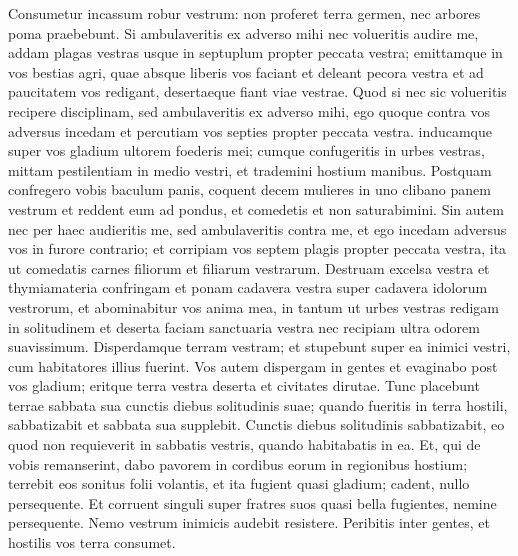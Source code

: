 \begin{biblechapter}
\begin{biblechapter}
\begin{biblechapter}
\begin{biblechapter}
\begin{biblechapter}
\begin{biblechapter}
\begin{biblechapter}
\begin{biblechapter}
\begin{biblechapter}
\begin{biblechapter}
\begin{biblechapter}
\begin{biblechapter}
\begin{biblechapter}
\begin{biblechapter}
\begin{biblechapter}
\begin{biblechapter}
\begin{biblechapter}
\begin{biblechapter}
\begin{biblechapter}
\begin{biblechapter}
\begin{biblechapter}
\begin{biblechapter}
\begin{biblechapter}
\begin{biblechapter}
\begin{biblechapter}
\begin{biblechapter}
\verse Consumetur incassum robur vestrum: non proferet terra germen, nec arbores poma praebebunt.
 \verse Si ambulaveritis ex adverso mihi nec volueritis audire me, addam plagas vestras usque in septuplum propter peccata vestra; 
\verse emittamque in vos bestias agri, quae absque liberis vos faciant et deleant pecora vestra et ad paucitatem vos redigant, desertaeque fiant viae vestrae.
 \verse Quod si nec sic volueritis recipere disciplinam, sed ambulaveritis ex adverso mihi, 
\verse ego quoque contra vos adversus incedam et percutiam vos septies propter peccata vestra. 
\verse inducamque super vos gladium ultorem foederis mei; cumque confugeritis in urbes vestras, mittam pestilentiam in medio vestri, et trademini hostium manibus. 
\verse Postquam confregero vobis baculum panis, coquent decem mulieres in uno clibano panem vestrum et reddent eum ad pondus, et comedetis et non saturabimini.
 \verse Sin autem nec per haec audieritis me, sed ambulaveritis contra me, 
\verse et ego incedam adversus vos in furore contrario; et corripiam vos septem plagis propter peccata vestra, 
\verse ita ut comedatis carnes filiorum et filiarum vestrarum. 
\verse Destruam excelsa vestra et thymiamateria confringam et ponam cadavera vestra super cadavera idolorum vestrorum, et abominabitur vos anima mea, 
\verse in tantum ut urbes vestras redigam in solitudinem et deserta faciam sanctuaria vestra nec recipiam ultra odorem suavissimum. 
\verse Disperdamque terram vestram; et stupebunt super ea inimici vestri, cum habitatores illius fuerint. 
\verse Vos autem dispergam in gentes et evaginabo post vos gladium; eritque terra vestra deserta et civitates dirutae.
 \verse Tunc placebunt terrae sabbata sua cunctis diebus solitudinis suae; quando fueritis in terra hostili, sabbatizabit et sabbata sua supplebit. 
\verse Cunctis diebus solitudinis sabbatizabit, eo quod non requieverit in sabbatis vestris, quando habitabatis in ea.
 \verse Et, qui de vobis remanserint, dabo pavorem in cordibus eorum in regionibus hostium; terrebit eos sonitus folii volantis, et ita fugient quasi gladium; cadent, nullo persequente. 
\verse Et corruent singuli super fratres suos quasi bella fugientes, nemine persequente. Nemo vestrum inimicis audebit resistere. 
 \verse Peribitis inter gentes, et hostilis vos terra consumet. 

\end{biblechapter}
\end{biblechapter}
\end{biblechapter}
\end{biblechapter}
\end{biblechapter}
\end{biblechapter}
\end{biblechapter}
\end{biblechapter}
\end{biblechapter}
\end{biblechapter}
\end{biblechapter}
\end{biblechapter}
\end{biblechapter}
\end{biblechapter}
\end{biblechapter}
\end{biblechapter}
\end{biblechapter}
\end{biblechapter}
\end{biblechapter}
\end{biblechapter}
\end{biblechapter}
\end{biblechapter}
\end{biblechapter}
\end{biblechapter}
\end{biblechapter}
\end{biblechapter}
